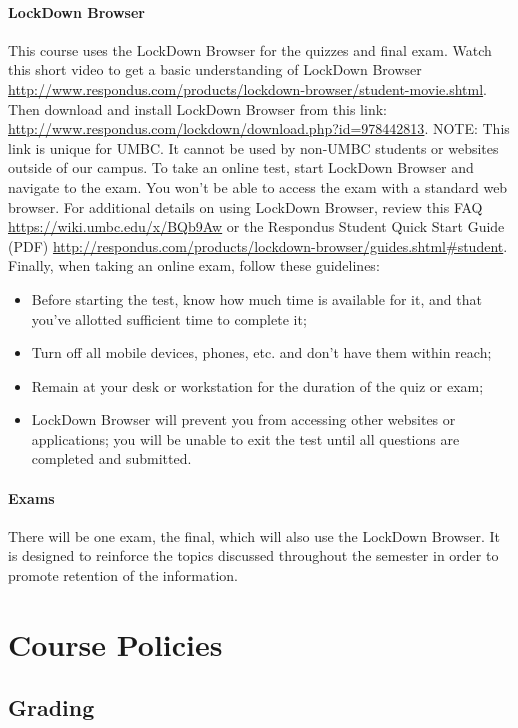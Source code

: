 \documentclass[letter,10pt]{article}
\begin{document}
\paragraph{LockDown Browser}This course uses the LockDown Browser for the quizzes and final exam. Watch this short video to get a basic understanding of LockDown Browser \url{http://www.respondus.com/products/lockdown-browser/student-movie.shtml}. Then download and install LockDown Browser from this link: \url{http://www.respondus.com/lockdown/download.php?id=978442813}. NOTE: This link is unique for UMBC. It cannot be used by non-UMBC students or websites outside of our campus. To take an online test, start LockDown Browser and navigate to the exam. You won't be able to access the exam with a standard web browser. For additional details on using LockDown Browser, review this FAQ \url{https://wiki.umbc.edu/x/BQb9Aw} or the Respondus Student Quick Start Guide (PDF) \url{http://respondus.com/products/lockdown-browser/guides.shtml#student}. Finally, when taking an online exam, follow these guidelines:
\begin{itemize}
\item Before starting the test, know how much time is available for it, and that you've allotted sufficient time to complete it;
\item Turn off all mobile devices, phones, etc. and don't have them within reach;
\item Remain at your desk or workstation for the duration of the quiz or exam;
\item LockDown Browser will prevent you from accessing other websites or applications; you will be unable to exit the test until all questions are completed and submitted.
\end{itemize}

\paragraph{Exams}There will be one exam, the final, which will also use the LockDown Browser. It is designed to reinforce the topics discussed throughout the semester in order to promote retention of the information.

\section*{Course Policies}
\subsection*{Grading}
\end{document}
